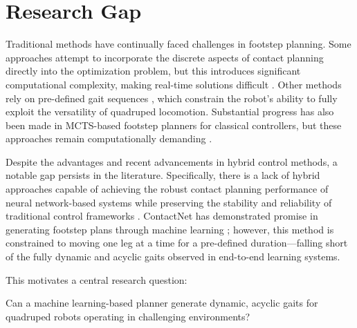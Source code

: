 \section{Research Gap}
\label{sec:research-gap}

Traditional methods have continually faced challenges in footstep
planning. Some approaches attempt to incorporate the discrete aspects
of contact planning directly into the optimization problem, but this
introduces significant computational complexity, making real-time
solutions difficult \cite{winkler_gait_2018}. Other methods rely on
pre-defined gait  sequences
\cite{xie_glide_2023, grandia_perceptive_2022, lee_learning_2020,
villarreal_fast_2019}, which constrain the robot's ability to fully
exploit the versatility of quadruped locomotion. Substantial progress
has also been made in MCTS-based footstep planners for classical
controllers, but these approaches remain computationally demanding
\cite{amatucci_monte_2022, taouil_non-gaited_2025}.

Despite the advantages and recent advancements in hybrid control
methods, a notable gap persists in the literature. Specifically,
there is a lack of hybrid approaches capable of achieving the robust
contact planning performance of neural network-based systems while
preserving the stability and reliability of traditional control
frameworks \cite{Meng2023Mar, Wensing2022Nov}. ContactNet
\cite{bratta_contactnet_2024} has demonstrated promise in generating
footstep plans through machine learning ; however, this method is
constrained to moving one leg at a time for a pre-defined
duration—falling short of the fully dynamic and acyclic gaits
observed in end-to-end learning systems.

This motivates a central research question:

\begin{emphasis}
  Can a machine learning-based planner generate dynamic, acyclic
  gaits for quadruped robots operating in challenging environments?
\end{emphasis}
